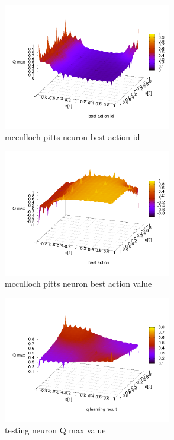 \documentclass[10pt,a5paper]{article}
\begin{document}
\begin{figure}[!ht]
\centering
\includegraphics[width=2.9in]{q_learning_test/experiment_01/mcculloch_pitts_neuron/q_action_id.png}
\caption{mcculloch pitts neuron best action id}
\label{mcculloch pitts neuron best action id}
\end{figure}

\begin{figure}[!ht]
\centering
\includegraphics[width=2.9in]{q_learning_test/experiment_01/mcculloch_pitts_neuron/q_action.png}
\caption{mcculloch pitts neuron best action value}
\label{mcculloch pitts neuron best action value}
\end{figure}

\begin{figure}[!ht]
\centering
\includegraphics[width=2.9in]{q_learning_test/experiment_01/testing_neuron/q_map.png}
\caption{testing neuron Q max value}
\label{testing neuron Q max value}
\end{figure}
\end{document}

